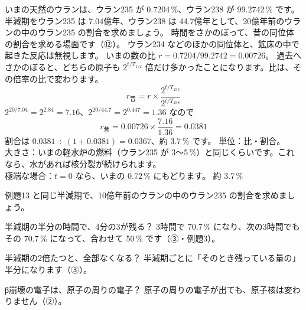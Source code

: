 \label{ph:原-12:ex13}
\begin{phreidai}
いまの天然のウランは、ウラン235 が 0.7204\,\%、ウラン238 が 99.2742\,\% です。半減期をウラン235 は 7.04億年、ウラン238 は 44.7億年として、20億年前のウランの中のウラン235 の割合を求めましょう。
\phbamen
時間をさかのぼって、昔の同位体の割合を求める場面です（⑫）。
\phmushi
ウラン234 などのほかの同位体と、鉱床の中で起きた反応は無視します。
\phzu
いまの数の比 $r=0.7204/99.2742=0.00726$。
\phriyu
過去へさかのぼると、どちらの原子も $2^{t/T_{1/2}}$ 倍だけ多かったことになります。比は、その倍率の比で変わります。
\phtateru
\[ r_{\text{昔}}=r\times\frac{2^{t/T_{235}}}{2^{t/T_{238}}} \]
\phtoku
$2^{20/7.04}=2^{2.84}=7.16$、$2^{20/44.7}=2^{0.447}=1.36$ なので
\[ r_{\text{昔}}=0.00726\times\frac{7.16}{1.36}=0.0381 \]
割合は $0.0381\div(1+0.0381)=0.0367$、約 3.7\,\% です。
\phtashikame
単位：比・割合。\\
大きさ：いまの軽水炉の燃料（ウラン235 が 3〜5\,\%）と同じくらいです。これなら、水があれば核分裂が続けられます。\\
極端な場合：$t=0$ なら、いまの 0.72\,\% にもどります。
\kotae 約 3.7\,\%
\end{phreidai}
\begin{jibun}
例題13 と同じ半減期で、10億年前のウランの中のウラン235 の割合を求めましょう。
\end{jibun}

\begin{tsumazuki}{半減期の半分の時間で、4分の3が残る？}
3時間で 70.7\,\% になり、次の3時間でもその 70.7\,\% になって、合わせて 50\,\% です（③・例題3）。
\end{tsumazuki}

\begin{tsumazuki}{半減期の2倍たつと、全部なくなる？}
半減期ごとに「そのとき残っている量の」半分になります（③）。
\end{tsumazuki}

\begin{tsumazuki}{β崩壊の電子は、原子の周りの電子？}
原子の周りの電子が出ても、原子核は変わりません（②）。
\end{tsumazuki}

